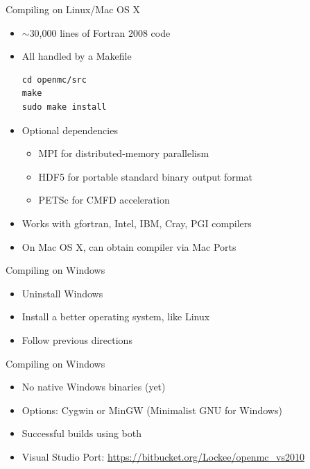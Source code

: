 \documentclass[serif]{beamer}
\begin{document}

\begin{frame}[fragile]{Compiling on Linux/Mac OS X}
  \begin{itemize}
  \vfill
  \item<1-> $\sim$30,000 lines of Fortran 2008 code
  \vfill
  \item<1-> All handled by a Makefile
\begin{lstlisting}
cd openmc/src
make
sudo make install
\end{lstlisting}
  \vfill
  \item<1-> Optional dependencies
    \begin{itemize}
    \item<1-> MPI for distributed-memory parallelism
    \item<1-> HDF5 for portable standard binary output format
    \item<1-> PETSc for CMFD acceleration
    \end{itemize}
  \vfill
  \item<1-> Works with gfortran, Intel, IBM, Cray, PGI compilers
  \vfill
  \item<1-> On Mac OS X, can obtain compiler via Mac Ports
  \vfill
  \end{itemize}
\end{frame}


\begin{frame}{Compiling on Windows}
  \begin{itemize}
  \item<1-> Uninstall Windows
  \item<1-> Install a better operating system, like Linux
  \item<1-> Follow previous directions
  \end{itemize}
\end{frame}


\begin{frame}{Compiling on Windows}
  \begin{itemize}
  \vfill
  \item<1-> No native Windows binaries (yet)
  \vfill
  \item<1-> Options: Cygwin or MinGW (Minimalist GNU for Windows)
  \vfill
  \item<1-> Successful builds using both
  \vfill
  \item<1-> Visual Studio Port:
    \url{https://bitbucket.org/Lockee/openmc\_vs2010}
  \vfill
  \end{itemize}
\end{frame}
\end{document}
